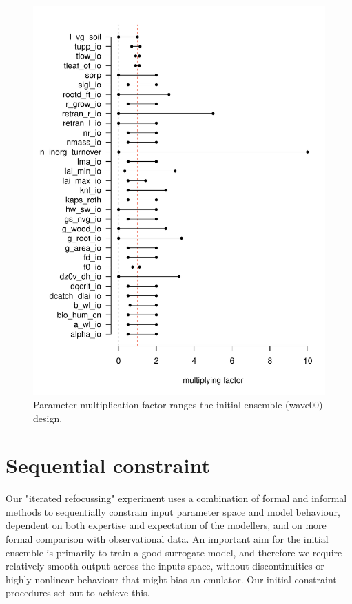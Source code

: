 \documentclass[gmd, manuscript]{copernicus}
\begin{document}
\begin{figure}[t]
\includegraphics[width=12cm]{./figs/fig01.pdf}
\caption{Parameter multiplication factor ranges the initial ensemble (wave00) design.}
\label{fig:lhs_range}
\end{figure}

\section{Sequential constraint}\label{sec:sequential_constraint}

Our "iterated refocussing" experiment uses a combination of formal and informal methods to sequentially constrain input parameter space and model behaviour, dependent on both expertise and expectation of the modellers, and on more formal comparison with observational data. An important aim for the initial ensemble is primarily to train a good surrogate model, and therefore we require relatively smooth output across the inputs space, without discontinuities or highly nonlinear behaviour that might bias an emulator. Our initial constraint procedures set out to achieve this.
\end{document}
